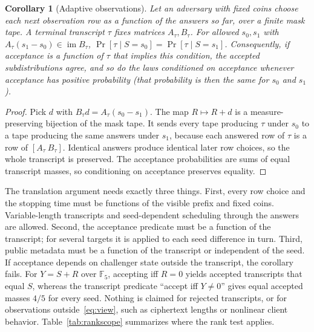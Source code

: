 \documentclass[pdflatex,sn-mathphys-num]{sn-jnl}%
\theoremstyle{plain}
\newtheorem{corollary}[theorem]{Corollary}
\theoremstyle{definition}
\newcommand{\F}{\mathbb{F}}
\newcommand{\im}{\operatorname{im}}
\begin{document}
\begin{corollary}[Adaptive observations]\label{cor:adaptive}
Let an adversary with fixed coins choose each next observation row as a function of the answers so far, over a finite mask tape. A terminal transcript $\tau$ fixes matrices $A_\tau,B_\tau$. For allowed $s_0,s_1$ with $A_\tau(s_1-s_0)\in\im B_\tau$, $\Pr[\tau\mid S=s_0]=\Pr[\tau\mid S=s_1]$. Consequently, if acceptance is a function of $\tau$ that implies this condition, the accepted subdistributions agree, and so do the laws conditioned on acceptance whenever acceptance has positive probability (that probability is then the same for $s_0$ and $s_1$).
\end{corollary}
\begin{proof}
Pick $d$ with $B_\tau d=A_\tau(s_0-s_1)$. The map $R\mapsto R+d$ is a measure-preserving bijection of the mask tape. It sends every tape producing $\tau$ under $s_0$ to a tape producing the same answers under $s_1$, because each answered row of $\tau$ is a row of $[A_\tau\ B_\tau]$. Identical answers produce identical later row choices, so the whole transcript is preserved. The acceptance probabilities are sums of equal transcript masses, so conditioning on acceptance preserves equality.
\end{proof}

The translation argument needs exactly three things. First, every row choice and the stopping time must be functions of the visible prefix and fixed coins. Variable-length transcripts and seed-dependent scheduling through the answers are allowed. Second, the acceptance predicate must be a function of the transcript; for several targets it is applied to each seed difference in turn. Third, public metadata must be a function of the transcript or independent of the seed. If acceptance depends on challenger state outside the transcript, the corollary fails. For $Y=S+R$ over $\F_5$, accepting iff $R=0$ yields accepted transcripts that equal $S$, whereas the transcript predicate ``accept iff $Y\neq0$'' gives equal accepted masses $4/5$ for every seed. Nothing is claimed for rejected transcripts, or for observations outside~\eqref{eq:view}, such as ciphertext lengths or nonlinear client behavior. Table~\ref{tab:rankscope} summarizes where the rank test applies.
\end{document}
